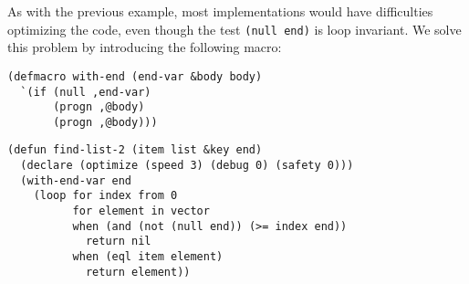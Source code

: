 As with the previous example, most \commonlisp{} implementations would
have difficulties optimizing the code, even though the test
\texttt{(null end)} is loop invariant.  We solve this problem by
introducing the following macro:

{\small\begin{verbatim}
(defmacro with-end (end-var &body body)
  `(if (null ,end-var)
       (progn ,@body)
       (progn ,@body)))
\end{verbatim}}

{\small\begin{verbatim}
(defun find-list-2 (item list &key end)
  (declare (optimize (speed 3) (debug 0) (safety 0)))
  (with-end-var end
    (loop for index from 0
          for element in vector
          when (and (not (null end)) (>= index end))
            return nil
          when (eql item element)
            return element))
\end{verbatim}}
